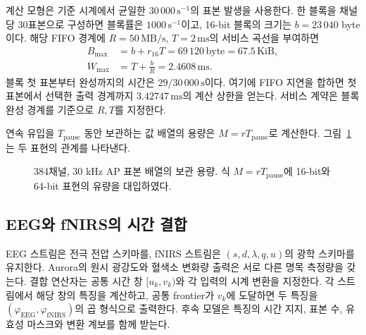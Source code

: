 계산 모형은 기준 시계에서 균일한 $30\,000\,\mathrm{s}^{-1}$의 표본 발생을 사용한다.
한 블록을 채널당 30표본으로 구성하면 블록률은 $1000\,\mathrm{s}^{-1}$이고,
16-bit 블록의 크기는 $b=23\,040$ byte이다. 해당 FIFO 경계에
$R=50\,\mathrm{MB/s}$, $T=2\,\mathrm{ms}$의 서비스 곡선을 부여하면
\begin{equation}
 \begin{aligned}
 B_{\max}&=b+r_{16}T=69\,120\,\mathrm{byte}=67.5\,\mathrm{KiB},\\
 W_{\max}&=T+\frac bR=2.4608\,\mathrm{ms}.
 \end{aligned}
\end{equation}
블록 첫 표본부터 완성까지의 시간은 $29/30\,000\,\mathrm{s}$이다.
여기에 FIFO 지연을 합하면 첫 표본에서 선택한 출력 경계까지 $3.42747\,\mathrm{ms}$의
계산 상한을 얻는다. 서비스 계약은 블록 완성 경계를 기준으로 $R,T$를 지정한다.

연속 유입을 $T_{\mathrm{pause}}$ 동안 보관하는 값 배열의 용량은
$M=rT_{\mathrm{pause}}$로 계산한다. 그림~\ref{fig:memory}는 두 표현의 관계를 나타낸다.
\begin{figure}[tb]
\centering
{}
\caption{384채널, 30 kHz AP 표본 배열의 보관 용량. 식 $M=rT_{\mathrm{pause}}$에 16-bit와 64-bit 표현의 유량을 대입하였다.}
\label{fig:memory}
\end{figure}

\subsection{EEG와 fNIRS의 시간 결합}
EEG 스트림은 전극 전압 스키마를, fNIRS 스트림은
$(s,d,\lambda,q,u)$의 광학 스키마를 유지한다. Aurora의 원시 광강도와 혈색소 변화량
출력은 서로 다른 명목 측정량을 갖는다\cite{nirx_formats}.
결합 연산자는 공통 시간 창 $[u_k,v_k)$와 각 입력의 시계 변환을 지정한다.
각 스트림에서 해당 창의 특징을 계산하고, 공통 frontier가 $v_k$에 도달하면
두 특징을 $(\varphi_{\mathrm{EEG}},\varphi_{\mathrm{fNIRS}})$의 곱 형식으로 출력한다.
후속 모델은 특징의 시간 지지, 표본 수, 유효성 마스크와 변환 계보를 함께 받는다.
